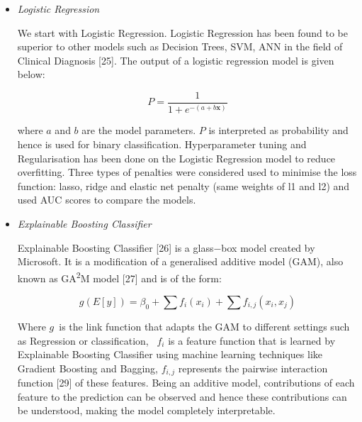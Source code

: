 \documentclass[11pt]{article}
\begin{document}
\begin{itemize}
\vspace{1\baselineskip}
	\item \textit{Logistic Regression}

We start with Logistic Regression. Logistic Regression has been found to be superior to other models such as Decision Trees, SVM, ANN in the field of Clinical Diagnosis [25]. The output of a logistic regression model is given below:

\vspace{1\baselineskip}
\begin{equation}
P =\frac{1}{1 + e^{ - (a + b\mathbf{x})}}
\end{equation}


\vspace{1\baselineskip}
where \( a\) and \( b\) are the model parameters. \( P\) is interpreted as probability and hence is used for binary classification. Hyperparameter tuning and Regularisation has been done on the Logistic Regression model to reduce overfitting. Three types of penalties were considered used to minimise the loss function: lasso, ridge and elastic net penalty (same weights of l1 and l2) and used AUC scores to compare the models. 

\vspace{1\baselineskip}
	\item \textit{Explainable Boosting Classifier}

Explainable Boosting Classifier [26] is a glass$-$box model created by Microsoft. It is a modification of a generalised additive model (GAM), also known as GA\textsuperscript{2}M model [27] and is of the form:

\vspace{1\baselineskip}
\begin{equation}
g(E[y]) = \beta_{0} + \sum f_{i}\left(x_{i}\right) + \sum f_{i,j}\left(x_{i},x_{j}\right)
\end{equation}


\vspace{1\baselineskip}
Where \( g\) is the link function that adapts the GAM to different settings such as Regression or classification,  \( f_{i}\) is a feature function that is learned by Explainable Boosting Classifier using machine learning techniques like Gradient Boosting and Bagging, \( f_{i,j}\) represents the pairwise interaction function [29] of these features. Being an additive model, contributions of each feature to the prediction can be observed and hence these contributions can be understood, making the model completely interpretable.


\end{itemize}
\end{document}
